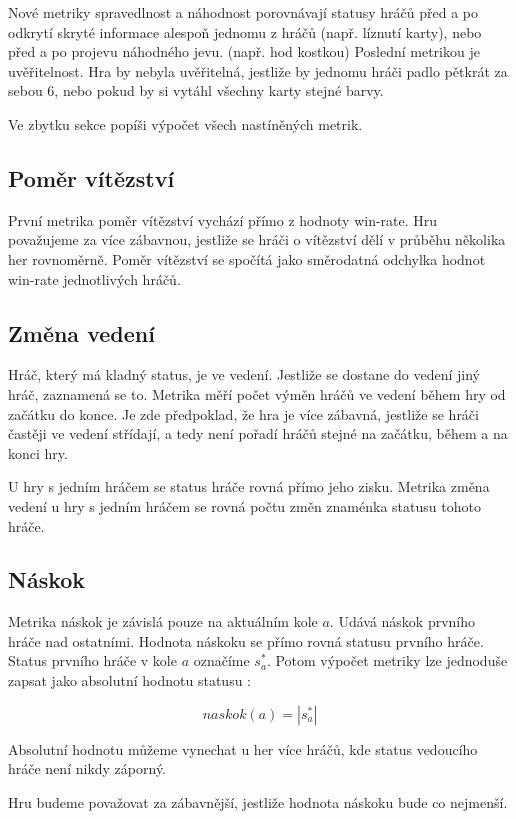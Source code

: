 Nové metriky spravedlnost a náhodnost porovnávají statusy hráčů před a po odkrytí skryté informace alespoň jednomu z hráčů (např. líznutí karty), nebo před a po projevu náhodného jevu. (např. hod kostkou) Poslední metrikou je uvěřitelnost. Hra by nebyla uvěřitelná, jestliže by jednomu hráči padlo pětkrát za sebou 6, nebo pokud by si vytáhl všechny karty stejné barvy. 

Ve zbytku sekce popíši výpočet všech nastíněných metrik.

\subsection{Poměr vítězství}

První metrika poměr vítězství vychází přímo z hodnoty win-rate. Hru považujeme za více zábavnou, jestliže se hráči o vítězství dělí v průběhu několika her rovnoměrně. Poměr vítězství se spočítá jako směrodatná odchylka hodnot win-rate jednotlivých hráčů.

\subsection{Změna vedení}

Hráč, který má kladný status, je ve vedení. Jestliže se dostane do vedení jiný hráč, zaznamená se to. Metrika měří počet výměn hráčů ve vedení během hry od začátku do konce. Je zde předpoklad, že hra je více zábavná, jestliže se hráči častěji ve vedení střídají, a tedy není pořadí hráčů stejné na začátku, během a na konci hry. 

U hry s jedním hráčem se status hráče rovná přímo jeho zisku. Metrika změna vedení u hry s jedním hráčem se rovná počtu změn znaménka statusu tohoto hráče.

\subsection{Náskok}

Metrika náskok je závislá pouze na aktuálním kole $a$. Udává náskok prvního hráče nad ostatními. Hodnota náskoku se přímo rovná statusu prvního hráče. Status prvního hráče v kole $a$ označíme $s^*_a$. Potom výpočet metriky lze jednoduše zapsat jako absolutní hodnotu statusu :

	\[
	naskok(a) = |s^*_a|
\]

Absolutní hodnotu můžeme vynechat u her více hráčů, kde status vedoucího hráče není nikdy záporný.

Hru budeme považovat za zábavnější, jestliže hodnota náskoku bude co nejmenší.

